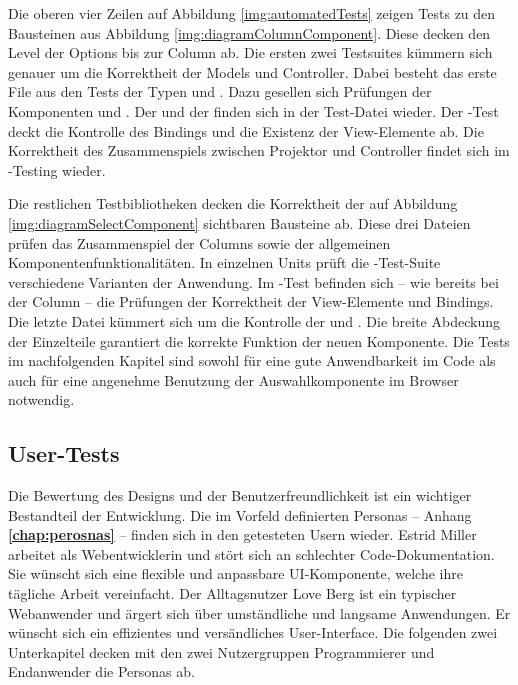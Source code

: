 Die oberen vier Zeilen auf Abbildung \ref{img:automatedTests} zeigen Tests zu den Bausteinen aus Abbildung \ref{img:diagramColumnComponent}. 
Diese decken den Level der Options bis zur Column ab. 
Die ersten zwei Testsuites kümmern sich genauer um die Korrektheit der Models und Controller. 
Dabei besteht das erste File aus den Tests der Typen  und . 
Dazu gesellen sich Prüfungen der Komponenten  und . 
Der  und der  finden sich in der Test-Datei wieder. 
Der -Test deckt die Kontrolle des Bindings und die Existenz der View-Elemente ab. 
Die Korrektheit des Zusammenspiels zwischen Projektor und Controller findet sich im -Testing wieder. 

Die restlichen Testbibliotheken decken die Korrektheit der auf Abbildung \ref{img:diagramSelectComponent} sichtbaren Bausteine ab. 
Diese drei Dateien prüfen das Zusammenspiel der Columns sowie der allgemeinen Komponentenfunktionalitäten. 
In einzelnen Units prüft die -Test-Suite verschiedene Varianten der Anwendung. 
Im -Test befinden sich – wie bereits bei der Column – die Prüfungen der Korrektheit der View-Elemente und Bindings. 
Die letzte Datei kümmert sich um die Kontrolle der  und . 
Die breite Abdeckung der Einzelteile garantiert die korrekte Funktion der neuen Komponente. 
Die Tests im nachfolgenden Kapitel sind sowohl für eine gute Anwendbarkeit im Code als auch für eine angenehme Benutzung der Auswahlkomponente im Browser notwendig. 


\subsection{User-Tests}
\label{sec:userTests}

Die Bewertung des Designs und der Benutzerfreundlichkeit ist ein wichtiger Bestandteil der Entwicklung. 
Die im Vorfeld definierten Personas – Anhang \textbf{\ref{chap:perosnas}} – finden sich in den getesteten Usern wieder. 
Estrid Miller arbeitet als Webentwicklerin und stört sich an schlechter Code-Dokumentation. 
Sie wünscht sich eine flexible und anpassbare UI-Komponente, welche ihre tägliche Arbeit vereinfacht. 
Der Alltagsnutzer Love Berg ist ein typischer Webanwender und ärgert sich über umständliche und langsame Anwendungen. 
Er wünscht sich ein effizientes und versändliches User-Interface. 
Die folgenden zwei Unterkapitel decken mit den zwei Nutzergruppen Programmierer und Endanwender die Personas ab. 


